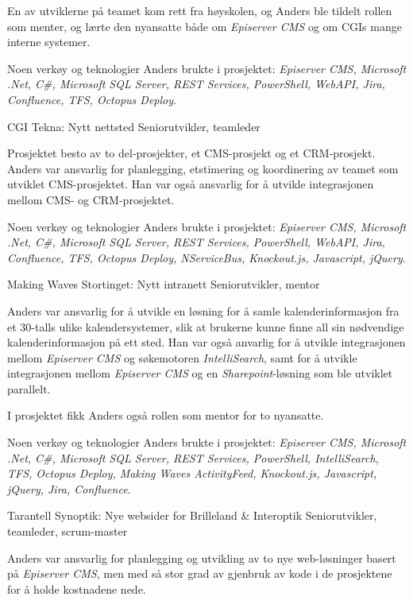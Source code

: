 \documentclass[10pt]{article} %
\begin{document}
\begin{paracol}{2}
{\qquad En av utviklerne på teamet kom rett fra høyskolen, og Anders ble tildelt rollen som menter, og lærte den nyansatte både om 
\textit{Episerver CMS} og om CGIs mange interne systemer. 

\qquad Noen verkøy og teknologier Anders brukte i prosjektet: \textit{Episerver CMS, Microsoft .Net, C\#, Microsoft SQL Server, REST Services, PowerShell, WebAPI, Jira, Confluence, TFS, Octopus Deploy}.} 

{CGI} 
{Tekna: Nytt nettsted} 
{Seniorutvikler, teamleder} 
{Prosjektet besto av to del-prosjekter, et CMS-prosjekt og et CRM-prosjekt. Anders var ansvarlig for planlegging, etstimering og koordinering av teamet som utviklet CMS-prosjektet. Han var også ansvarlig for å utvikle integrasjonen mellom CMS- og CRM-prosjektet.

\qquad Noen verkøy og teknologier Anders brukte i prosjektet: \textit{Episerver CMS, Microsoft .Net, C\#, Microsoft SQL Server, REST Services, PowerShell, WebAPI, Jira, Confluence, TFS, Octopus Deploy, NServiceBus, Knockout.js, Javascript, jQuery}.} 

{Making Waves} 
{Stortinget: Nytt intranett} 
{Seniorutvikler, mentor} 
{Anders var ansvarlig for å utvikle en løsning for å samle kalenderinformasjon fra et 30-talls ulike kalendersystemer, slik at
brukerne kunne finne all sin nødvendige kalenderinformasjon på ett sted. Han var også anvarlig for å utvikle integrasjonen mellom 
\textit{Episerver CMS} og søkemotoren \textit{IntelliSearch}, samt for å utvikle integrasjonen mellom \textit{Episerver CMS} og
en \textit{Sharepoint}-løsning som ble utviklet parallelt.

\qquad I prosjektet fikk Anders også rollen som mentor for to nyansatte.

\qquad Noen verkøy og teknologier Anders brukte i prosjektet: \textit{Episerver CMS, Microsoft .Net, C\#, Microsoft SQL Server, REST Services, PowerShell, IntelliSearch, TFS, Octopus Deploy, Making Waves ActivityFeed, Knockout.js, Javascript, jQuery, Jira, Confluence}.} 



{Tarantell} 
{Synoptik: Nye websider for Brilleland \& Interoptik} 
{Seniorutvikler, teamleder, scrum-master} 
{Anders var ansvarlig for planlegging og utvikling av to nye web-løsninger basert på \textit{Episerver CMS}, men med så stor grad av gjenbruk av kode i de prosjektene for å holde kostnadene nede.

}
\end{paracol}
\end{document}
